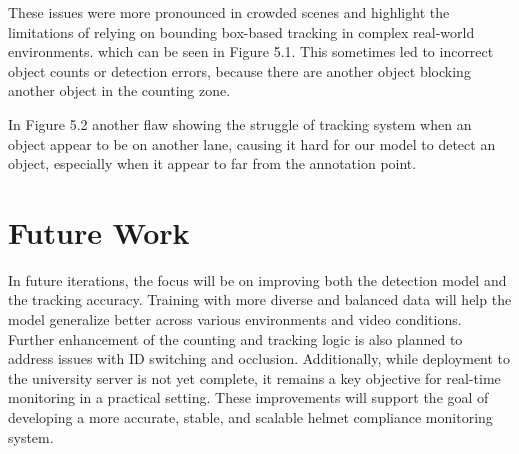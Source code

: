  These issues were more pronounced in crowded scenes and highlight the limitations of relying on bounding box-based tracking in complex real-world environments. which can be seen in Figure 5.1. This sometimes led to incorrect object counts or detection errors, because there are another object blocking another object in the counting zone. 

In Figure 5.2 another flaw showing the struggle of tracking system when an object appear to be on another lane, causing it hard for our model to detect an object, especially when it appear to far from the annotation point.


\section{Future Work}
\setlength{\parindent}{2.5em}
In future iterations, the focus will be on improving both the detection model and the tracking accuracy. Training with more diverse and balanced data will help the model generalize better across various environments and video conditions. Further enhancement of the counting and tracking logic is also planned to address issues with ID switching and occlusion. Additionally, while deployment to the university server is not yet complete, it remains a key objective for real-time monitoring in a practical setting. These improvements will support the goal of developing a more accurate, stable, and scalable helmet compliance monitoring system.



